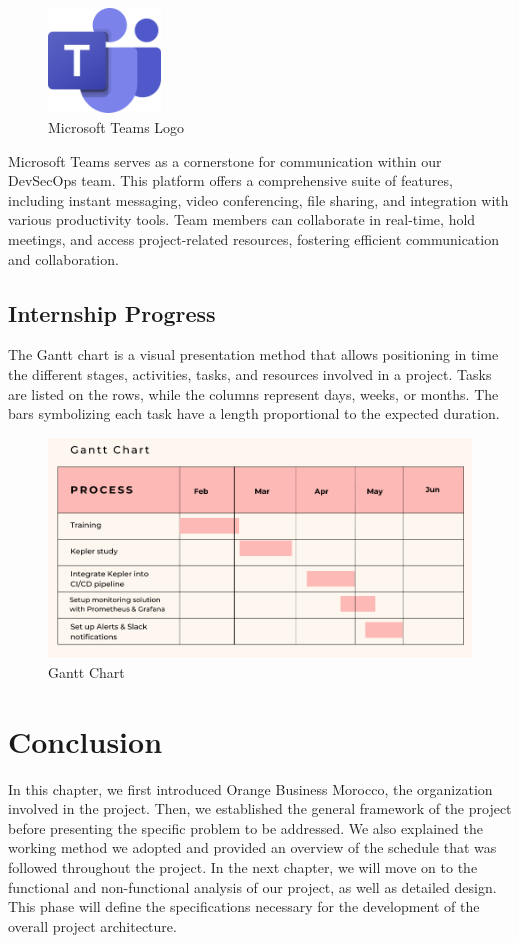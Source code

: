 \begin{figure}[H]
  \centering
  \includegraphics[width=3cm]{Logos/microsoft_teams_logo.png}
  \caption{Microsoft Teams Logo}
\end{figure}

Microsoft Teams serves as a cornerstone for communication within our DevSecOps team. This platform offers a comprehensive suite of features, including instant messaging, video conferencing, file sharing, and integration with various productivity tools. Team members can collaborate in real-time, hold meetings, and access project-related resources, fostering efficient communication and collaboration.

\subsection{Internship Progress}

The Gantt chart is a visual presentation method that allows positioning in time the different stages, activities, tasks, and resources involved in a project. Tasks are listed on the rows, while the columns represent days, weeks, or months. The bars symbolizing each task have a length proportional to the expected duration.
\begin{figure}[H]
    \centering
    \includegraphics[width=16cm]{Figures/gantt-chart.png}
    \caption{Gantt Chart}
\end{figure}
\section{Conclusion}
In this chapter, we first introduced Orange Business Morocco, the organization involved in the project. Then, we established the general framework of the project before presenting the specific problem to be addressed. We also explained the working method we adopted and provided an overview of the schedule that was followed throughout the project. In the next chapter, we will move on to the functional and non-functional analysis of our project, as well as detailed design. This phase will define the specifications necessary for the development of the overall project architecture.